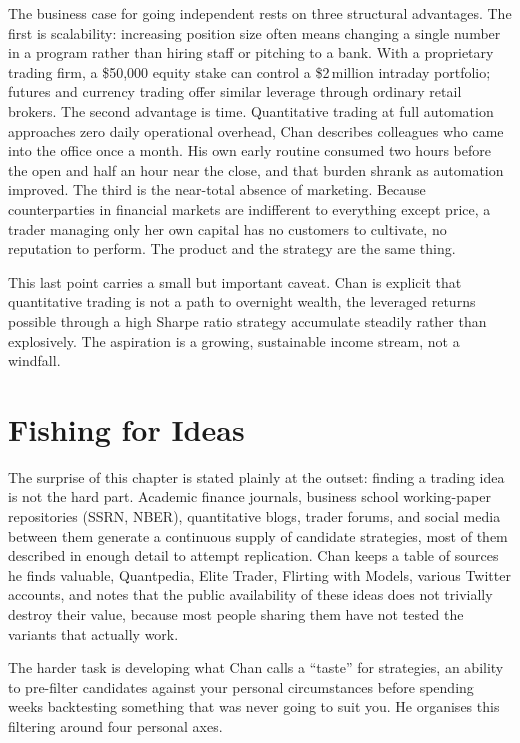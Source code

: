 \documentclass[12pt, a4paper]{article}
\begin{document}
The business case for going independent rests on three structural advantages. The first is scalability: increasing position size often means changing a single number in a program rather than hiring staff or pitching to a bank. With a proprietary trading firm, a \$50,000 equity stake can control a \$2\,million intraday portfolio; futures and currency trading offer similar leverage through ordinary retail brokers. The second advantage is time. Quantitative trading at full automation approaches zero daily operational overhead, Chan describes colleagues who came into the office once a month. His own early routine consumed two hours before the open and half an hour near the close, and that burden shrank as automation improved. The third is the near-total absence of marketing. Because counterparties in financial markets are indifferent to everything except price, a trader managing only her own capital has no customers to cultivate, no reputation to perform. The product and the strategy are the same thing.

This last point carries a small but important caveat. Chan is explicit that quantitative trading is not a path to overnight wealth, the leveraged returns possible through a high Sharpe ratio strategy accumulate steadily rather than explosively. The aspiration is a growing, sustainable income stream, not a windfall.


\section{Fishing for Ideas}

The surprise of this chapter is stated plainly at the outset: finding a trading idea is not the hard part. Academic finance journals, business school working-paper repositories (SSRN, NBER), quantitative blogs, trader forums, and social media between them generate a continuous supply of candidate strategies, most of them described in enough detail to attempt replication. Chan keeps a table of sources he finds valuable, Quantpedia, Elite Trader, Flirting with Models, various Twitter accounts, and notes that the public availability of these ideas does not trivially destroy their value, because most people sharing them have not tested the variants that actually work.

The harder task is developing what Chan calls a ``taste'' for strategies, an ability to pre-filter candidates against your personal circumstances before spending weeks backtesting something that was never going to suit you. He organises this filtering around four personal axes.
\end{document}
